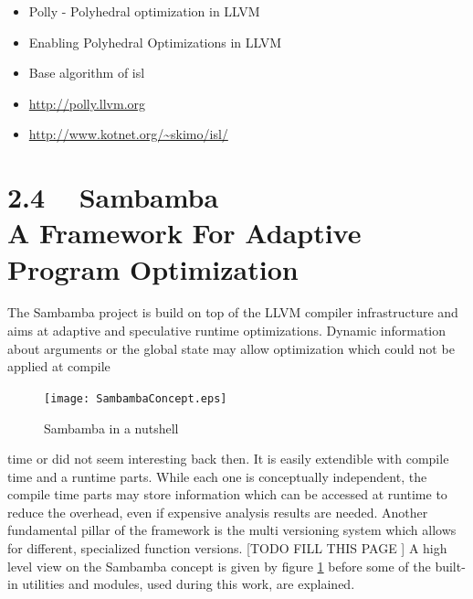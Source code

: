 \begin{itemize}
  \item Polly - Polyhedral optimization in LLVM \cite{grosser.11.impact}  
  \item Enabling Polyhedral Optimizations in LLVM \cite{grosser:thesis}
  \item Base algorithm of isl \cite{Bondhugula:2008:PAP:1379022.1375595}
  \item \url{http://polly.llvm.org} \nocite{Polly:Online}
  \item \url{http://www.kotnet.org/~skimo/isl/} \nocite{ISL:Online}
\end{itemize}





\clearpage
{}
\section*{2.4 ~ Sambamba \\ A Framework For Adaptive Program Optimization}
The Sambamba project is build on top of the LLVM compiler infrastructure and 
aims at adaptive and speculative runtime optimizations.
Dynamic information about arguments or the global state may allow optimization
which could not be applied at compile 
\begin{figure}
  \centering
  \texttt{[image: SambambaConcept.eps]}
  \caption{Sambamba in a nutshell}
  \label{fig:SambambaConcept}  
\end{figure}
time or did not seem interesting back then. It is easily extendible with 
compile time and a runtime parts. While each one is conceptually 
independent, the compile time parts may store information which can be accessed
at runtime to reduce the overhead, even if expensive analysis results are needed. 
Another fundamental pillar of the framework is the multi versioning system which
allows for different, specialized function versions.
[TODO FILL THIS PAGE ]
A high level view on the Sambamba concept is given
by figure \ref{fig:SambambaConcept} before some of the  built-in utilities 
and modules, used during this work, are explained. 


